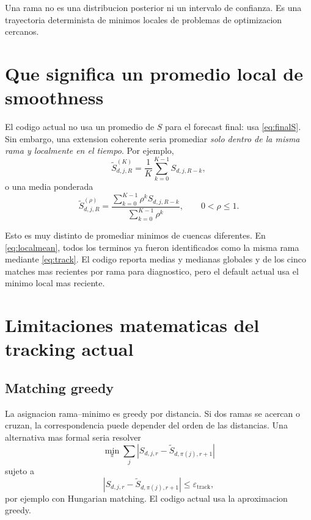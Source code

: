 \documentclass[11pt]{article}
\begin{document}
Una rama no es una distribucion posterior ni un intervalo de confianza. Es una
trayectoria determinista de minimos locales de problemas de optimizacion
cercanos.

\section{Que significa un promedio local de smoothness}

El codigo actual no usa un promedio de \(S\) para el forecast final: usa
\eqref{eq:finalS}. Sin embargo, una extension coherente seria promediar
\emph{solo dentro de la misma rama y localmente en el tiempo}. Por ejemplo,
\begin{equation}
\widetilde S_{d,j,R}^{(K)}
=
\frac{1}{K}
\sum_{k=0}^{K-1}
S_{d,j,R-k},
\label{eq:localmean}
\end{equation}
o una media ponderada
\begin{equation}
\widetilde S_{d,j,R}^{(\rho)}
=
\frac{
\sum_{k=0}^{K-1}
\rho^k S_{d,j,R-k}
}{
\sum_{k=0}^{K-1}\rho^k
},
\qquad 0<\rho\le1.
\label{eq:weightedmean}
\end{equation}

Esto es muy distinto de promediar minimos de cuencas diferentes. En
\eqref{eq:localmean}, todos los terminos ya fueron identificados como la misma
rama mediante \eqref{eq:track}. El codigo reporta medias y medianas globales y
de los cinco matches mas recientes por rama para diagnostico, pero el default
actual usa el minimo local mas reciente.

\section{Limitaciones matematicas del tracking actual}

\subsection{Matching greedy}

La asignacion rama--minimo es greedy por distancia. Si dos ramas se acercan o
cruzan, la correspondencia puede depender del orden de las distancias. Una
alternativa mas formal seria resolver
\begin{equation}
\min_{\pi}
\sum_j
|S_{d,j,r}-\widetilde S_{d,\pi(j),r+1}|
\label{eq:assignment}
\end{equation}
sujeto a
\[
|S_{d,j,r}-\widetilde S_{d,\pi(j),r+1}|
\le
\varepsilon_{\mathrm{track}},
\]
por ejemplo con Hungarian matching. El codigo actual usa la aproximacion
greedy.
\end{document}
